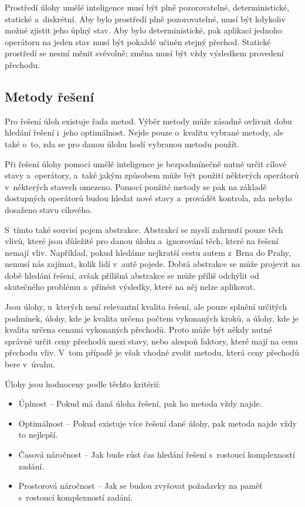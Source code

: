 Prostředí úlohy umělé inteligence musí být plně pozorovatelné, deterministické, statické a~diskrétní. Aby bylo prostředí plně pozorovatelné, musí být kdykoliv možné zjistit jeho úplný stav. Aby bylo deterministické, pak aplikací jednoho operátoru na jeden stav musí být pokaždé učiněn stejný přechod. Statické prostředí se nesmí měnit svévolně; změna musí být vždy výsledkem provedení přechodu.

\subsection*{Metody řešení}

Pro řešení úloh existuje řada metod. Výběr metody může zásadně ovlivnit dobu hledání řešení i~jeho optimálnost. Nejde pouze o~kvalitu vybrané metody, ale také o~to, zda se pro danou úlohu hodí vybranou metodu použít.

Při řešení úlohy pomocí umělé inteligence je bezpodmínečně nutné určit cílové stavy a~operátory, a~také jakým způsobem může být použití některých operátorů v~některých stavech omezeno. Pomocí použité metody se pak na základě dostupných operátorů budou hledat nové stavy a~provádět kontrola, zda nebylo dosaženo stavu cílového.

S~tímto také souvisí pojem abstrakce. Abstrakcí se myslí zahrnutí pouze těch vlivů, které jsou důležité pro danou úlohu a~ignorování těch, které na řešení nemají vliv. Například, pokud hledáme nejkratší cestu autem z~Brna do Prahy, nemusí nás zajímat, kolik lidí v~autě pojede. Dobrá abstrakce se může projevit na době hledání řešení, avšak přílišná abstrakce se může příliš odchýlit od skutečného problému a~přinést výsledky, které na něj nelze aplikovat.

Jsou úlohy, u~kterých není relevantní kvalita řešení, ale pouze splnění určitých podmínek, úlohy, kde je kvalita určena počtem vykonaných kroků, a úlohy, kde je kvalita určena cenami vykonaných přechodů. Proto může být někdy nutné správně určit ceny přechodů mezi stavy, nebo alespoň faktory, které mají na cenu přechodu vliv. V~tom případě je však vhodné zvolit metodu, která ceny přechodů bere v~úvahu.

Úlohy jsou hodnoceny podle těchto kritérií:
\begin{itemize}
    \item Úplnost -- Pokud má daná úloha řešení, pak ho metoda vždy najde.
    \item Optimálnost -- Pokud existuje více řešení dané úlohy, pak metoda najde vždy to nejlepší.
    \item Časová náročnost -- Jak bude růst čas hledání řešení s~rostoucí komplexností zadání.
    \item Prostorová náročnost -- Jak se budou zvyšovat požadavky na paměť s~rostoucí komplexností zadání.
\end{itemize}

